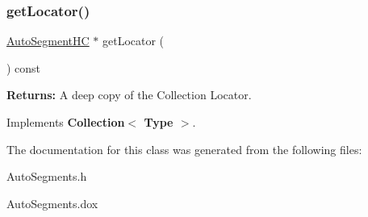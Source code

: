\subsubsection{\texorpdfstring{get\+Locator()}{getLocator()}}
{\footnotesize\ttfamily \hyperlink{namespaceKatabatic_acb3628dc7705fefe38a665cfe43efa6e}{Auto\+Segment\+HC} $\ast$ get\+Locator (\begin{DoxyParamCaption}{ }\end{DoxyParamCaption}) const\hspace{0.3cm}{\ttfamily [virtual]}}

{\bfseries Returns\+:} A deep copy of the Collection Locator. 

Implements \textbf{ Collection$<$ Type $>$}.



The documentation for this class was generated from the following files\+:\begin{DoxyCompactItemize}
\item 
Auto\+Segments.\+h\item 
Auto\+Segments.\+dox\end{DoxyCompactItemize}
